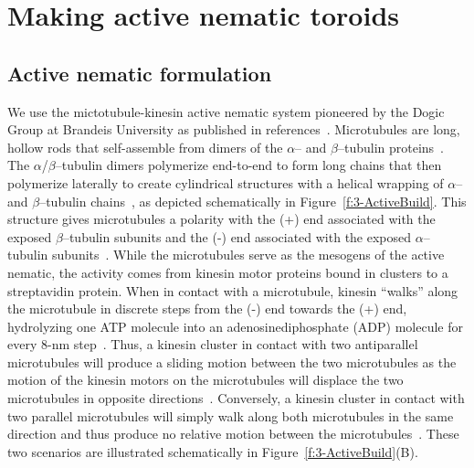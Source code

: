 \section{Making active nematic toroids}
\subsection{Active nematic formulation}
We use the mictotubule-kinesin active nematic system pioneered by the Dogic Group at Brandeis University as published in references~\cite{RN3,RN27,RN9,RN135,RN134}.
Microtubules are long, hollow rods that self-assemble from dimers of the $\alpha$-- and $\beta$--tubulin proteins~\cite{RN248}.
The $\alpha$/$\beta$--tubulin dimers polymerize end-to-end to form long chains that then polymerize laterally to create cylindrical structures with a helical wrapping of $\alpha$-- and $\beta$--tubulin chains~\cite{RN248,RN249}, as depicted schematically in Figure~\ref{f:3-ActiveBuild}.
This structure gives microtubules a polarity with the (+) end associated with the exposed $\beta$--tubulin subunits and the (-) end associated with the exposed $\alpha$--tubulin subunits~\cite{RN248,RN249}.
While the microtubules serve as the mesogens of the active nematic, the activity comes from kinesin motor proteins bound in clusters to a streptavidin protein.
When in contact with a microtubule, kinesin ``walks'' along the microtubule in discrete steps from the (-) end towards the (+) end, hydrolyzing one ATP molecule into an adenosinediphosphate (ADP) molecule for every 8-nm step~\cite{RN250}.
Thus, a kinesin cluster in contact with two antiparallel microtubules will produce a sliding motion between the two microtubules as the motion of the kinesin motors on the microtubules will displace the two microtubules in opposite directions~\cite{RN4,RN3}.
Conversely, a kinesin cluster in contact with two parallel microtubules will simply walk along both microtubules in the same direction and thus produce no relative motion between the microtubules~\cite{RN4,RN3}. These two scenarios are illustrated schematically in Figure~\ref{f:3-ActiveBuild}(B).

